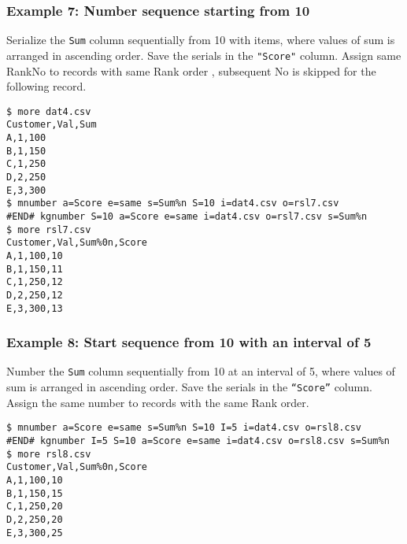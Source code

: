 \subsubsection*{Example 7: Number sequence starting from 10}

Serialize the \verb|Sum| column sequentially from 10 with items, where values of sum is arranged in ascending order. Save the serials in the \verb|"Score"| column. Assign same RankNo to records with same Rank order , subsequent No is skipped for the following record.


\begin{Verbatim}[baselinestretch=0.7,frame=single]
$ more dat4.csv
Customer,Val,Sum
A,1,100
B,1,150
C,1,250
D,2,250
E,3,300
$ mnumber a=Score e=same s=Sum%n S=10 i=dat4.csv o=rsl7.csv
#END# kgnumber S=10 a=Score e=same i=dat4.csv o=rsl7.csv s=Sum%n
$ more rsl7.csv
Customer,Val,Sum%0n,Score
A,1,100,10
B,1,150,11
C,1,250,12
D,2,250,12
E,3,300,13
\end{Verbatim}
\subsubsection*{Example 8: Start sequence from 10 with an interval of 5}

Number the \verb|Sum| column sequentially from 10 at an interval of 5, where values of sum is arranged in ascending order. Save the serials in the \verb|“Score”| column. Assign the same number to records with the same Rank order.


\begin{Verbatim}[baselinestretch=0.7,frame=single]
$ mnumber a=Score e=same s=Sum%n S=10 I=5 i=dat4.csv o=rsl8.csv
#END# kgnumber I=5 S=10 a=Score e=same i=dat4.csv o=rsl8.csv s=Sum%n
$ more rsl8.csv
Customer,Val,Sum%0n,Score
A,1,100,10
B,1,150,15
C,1,250,20
D,2,250,20
E,3,300,25
\end{Verbatim}

